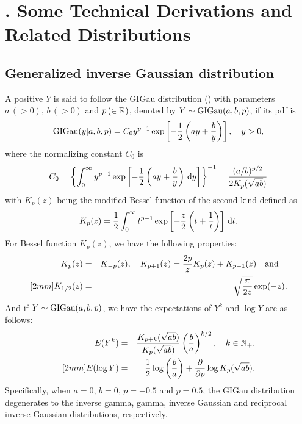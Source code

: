 \section{$\!\!\!\!\!\!\!$. Some Technical Derivations and Related Distributions}        %

\subsection{Generalized inverse Gaussian distribution}\label{zyf.four.S.sec:GIGau}      %

A positive \trv $Y$ is said to follow the GIGau distribution (\cite{Jorgensen2012}) with parameters $a \, (>0)$, $b \, (>0)$ and $p \, (\in{\mathbb{R}})$, denoted by $Y\sim\mbox{GIGau}(a, b, p)$, if its pdf is
\begin{eqnarray}    \label{zyf.four.S2.1}
   \mbox{GIGau}(y|a,b,p) = C_0y^{p-1} \exp \left[-\frac{1}{2} \left(ay+\frac{b}{y}\right) \right],\quad y>0,
\end{eqnarray}
where the normalizing constant $C_0$ is
$$
    C_0=\left\{\int_0^{\infty}y^{p-1}\exp\left[-\frac{1}{2} \left(ay+\frac{b}{y}\right)\,\mbox{d} y\right]\right\}^{-1}=\frac{(a/b)^{p/2}}{2K_p(\sqrt{ab})}
$$
with $K_p(z)$ being the modified Bessel function of the second kind defined as
\begin{eqnarray}    \label{zyf.four.S2.2}
   K_p(z) = \frac{1}{2}\int_0^{\infty}t^{p-1} \exp\left[-\frac{z}{2}\left(t+\frac{1}{t} \right)\right]\,\mbox{d} t.
\end{eqnarray}
For Bessel function $K_p(z)$, we have the following properties:
\begin{eqnarray*}
   K_p(z)&=&K_{-p}(z), \quad  K_{p+1}(z) = \frac{2p}{z}K_p(z) +K_{p-1}(z) \quad \mbox{and} \quad  \\ [2mm]
   K_{1/2}(z)&=&\sqrt{\frac{\pi}{2z}}\exp(-z).
\end{eqnarray*}
And if $Y\sim\mbox{GIGau}(a,b,p)$, we have the expectations of $Y^k$ and $\log Y$ are as follows:
\begin{eqnarray*}
   E(Y^k)&=&\frac{K_{p+k}(\sqrt{ab})}{K_p(\sqrt{ab})}\left(\frac{b}{a}\right)^{k/2},\quad k \in{\mathbb{N}}_+, \nonumber \\ [2mm]
   E(\log Y)&=& \frac{1}{2} \log\left(\frac{b}{a} \right) +\frac{\partial } {\partial  p} \log K_p(\sqrt{ab}).
\end{eqnarray*}
Specifically, when $a=0$, $b=0$, $p=-0.5$ and $p = 0.5$, the GIGau distribution degenerates to the inverse gamma, gamma, inverse Gaussian and reciprocal inverse Gaussian distributions, respectively.

